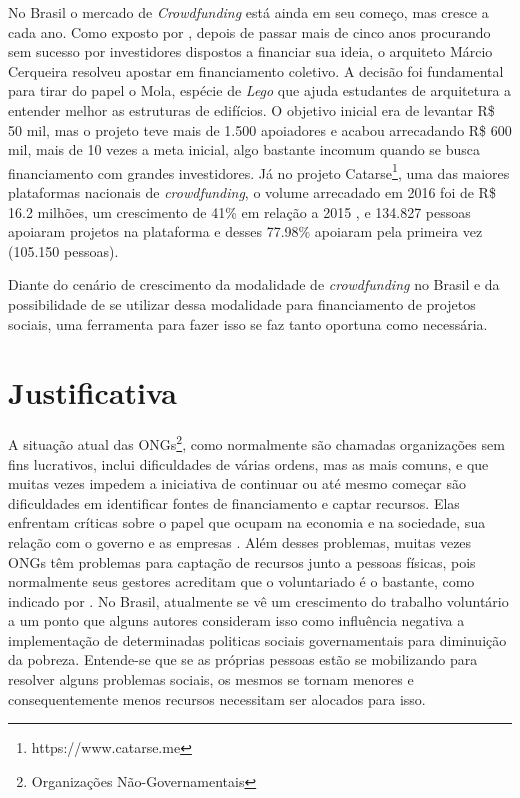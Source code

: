 No Brasil o mercado de \emph{Crowdfunding} está ainda em seu começo, mas cresce a cada ano. Como exposto por \citeauthor{globo-financiamento}, depois de passar mais de cinco anos procurando sem sucesso por investidores dispostos a financiar sua ideia, o arquiteto Márcio Cerqueira resolveu apostar em financiamento coletivo. A decisão foi fundamental para tirar do papel o Mola, espécie de \emph{Lego} que ajuda estudantes de arquitetura a entender melhor as estruturas de edifícios. O objetivo inicial era de levantar R\$ 50 mil, mas o projeto teve mais de 1.500 apoiadores e acabou arrecadando R\$ 600 mil, mais de 10 vezes a meta inicial, algo bastante incomum quando se busca financiamento com grandes investidores. Já no projeto Catarse\footnote{https://www.catarse.me}, uma das maiores plataformas nacionais de \emph{crowdfunding}, o volume arrecadado em 2016 foi de R\$ 16.2 milhões, um crescimento de 41\% em relação a 2015 \cite{catarse-retrospectiva2016}, e 134.827 pessoas apoiaram projetos na plataforma e desses 77.98\% apoiaram pela primeira vez (105.150 pessoas).

Diante do cenário de crescimento da modalidade de \emph{crowdfunding} no Brasil e da possibilidade de se utilizar dessa modalidade para financiamento de projetos sociais, uma ferramenta para fazer isso se faz tanto oportuna como necessária.



\section{Justificativa}
A situação atual das ONGs\footnote{Organizações Não-Governamentais}, como normalmente são chamadas organizações sem fins lucrativos, inclui dificuldades de várias ordens, mas as mais comuns, e que muitas vezes impedem a iniciativa de continuar ou até mesmo começar são dificuldades em identificar fontes de financiamento e captar recursos. Elas enfrentam críticas sobre o papel que ocupam na economia e na sociedade, sua relação com o governo e as empresas \cite{GOUVEIA2007}. Além desses problemas, muitas vezes ONGs têm problemas para captação de recursos junto a pessoas físicas, pois normalmente seus gestores acreditam que o voluntariado é o bastante, como indicado por \citeauthor{modeloGestaoONG}. No Brasil, atualmente se vê um crescimento do trabalho voluntário a um ponto que alguns autores \cite{fagundes2012repercussoes} consideram isso como influência negativa a implementação de determinadas politicas sociais governamentais para diminuição da pobreza. Entende-se que se as próprias pessoas estão se mobilizando para resolver alguns problemas sociais, os mesmos se tornam menores e consequentemente menos recursos necessitam ser alocados para isso.

